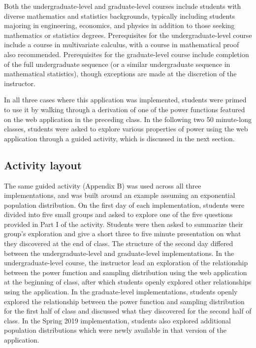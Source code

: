 \documentclass{TISE}
\begin{document}
Both the undergraduate-level and graduate-level courses include students with diverse mathematics and statistics backgrounds, typically including students majoring in engineering, economics, and physics in addition to those seeking mathematics or statistics degrees. Prerequisites for the undergraduate-level course include a course in multivariate calculus, with a course in mathematical proof also recommended. Prerequisites for the graduate-level course include completion of the full undergraduate sequence (or a similar undergraduate sequence in mathematical statistics), though exceptions are made at the discretion of the instructor. 

In all three cases where this application was implemented, students were primed to use it by walking through a derivation of one of the power functions featured on the web application in the preceding class. In the following two 50 minute-long classes, students were asked to explore various properties of power using the web application through a guided activity, which is discussed in the next section. 

\subsection{Activity layout}

The same guided activity (Appendix B) was used across all three implementations, and was built around an example assuming an exponential population distribution. On the first day of each implementation, students were divided into five small groups and asked to explore one of the five questions provided in Part I of the activity. Students were then asked to summarize their group's exploration and give a short three to five minute presentation on what they discovered at the end of class. The structure of the second day differed between the undergraduate-level and graduate-level implementations. In the undergraduate-level course, the instructor lead an exploration of the relationship between the power function and sampling distribution using the web application at the beginning of class, after which students openly explored other relationships using the application. In the graduate-level implementations, students openly explored the relationship between the power function and sampling distribution for the first half of class and discussed what they discovered for the second half of class. In the Spring 2019 implementation, students also explored additional population distributions which were newly available in that version of the application.
\end{document}
